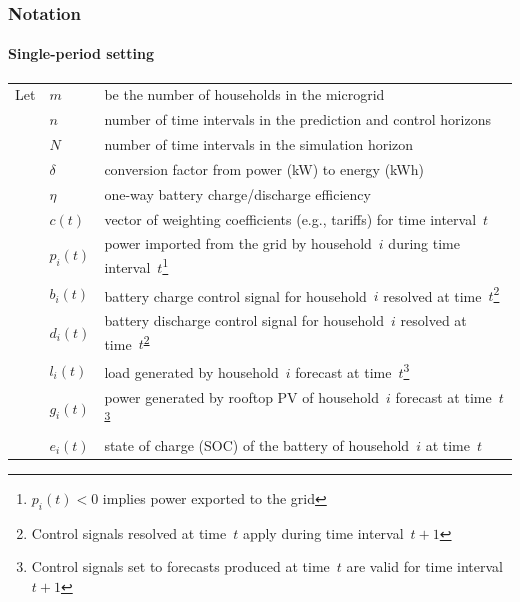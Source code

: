 \documentclass[handout, smaller, xcolor=table]{beamer}			%
\def\el{l}
\begin{document}
\begin{frame}
	\frametitle{Notation}
	\framesubtitle{Single-period setting}
	
	\begin{tabular}{l l l}
		Let & $m$ & be the number of households in the microgrid\\
		& $n$ & number of time intervals in the prediction and control horizons\\
		& $N$ & number of time intervals in the simulation horizon\\
		& $\delta$ & conversion factor from power (kW) to energy (kWh)\\
		& $\eta$ & one-way battery charge/discharge efficiency\\
		& $c(t)$ & vector of weighting coefficients (e.g., tariffs) for time interval~$t$\\
		& $p_{i}(t)$ & power imported from the grid by household~$i$ during time interval~$t$\footnote{
$p_{i}(t) < 0$ implies power exported to the grid	
}\\
		& $b_{i}(t)$ & battery charge control signal for household~$i$ resolved at time~$t$\footnote{\label{fn:dagger}
Control signals resolved at time~$t$ apply during time interval~$t\!+\!1$
}\\
		& $d_{i}(t)$ & battery discharge control signal for household~$i$ resolved at time~$t$\textsuperscript{\ref{fn:dagger}}\\
		& $\el_{i}(t)$ & load generated by household~$i$ forecast at time~$t$\footnote{\label{fn:ddagger}
Control signals set to forecasts produced at time~$t$ are valid for time interval~$t\!+\!1$
}\\
		& $g_{i}(t)$ & power generated by rooftop PV of household~$i$ forecast at time~$t$\textsuperscript{\ref{fn:ddagger}}\\
		& $e_{i}(t)$ & state of charge (SOC) of the battery of household~$i$ at time~$t$\\	
	\end{tabular}
	
\end{frame}
\end{document}
